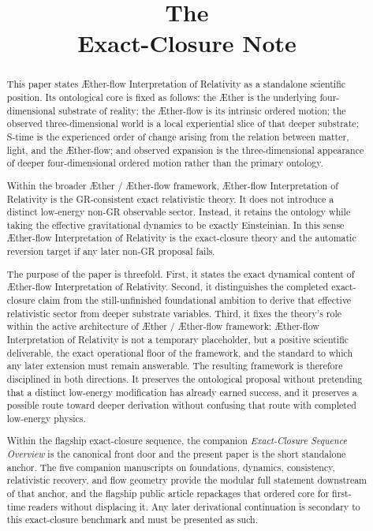 \documentclass[11pt]{article}
\title{\textbf{The \TheoryName{}}\\[0.4em]
\large Exact-Closure Note}
\author{}
\date{}
\newcommand{\Aether}{\AE{}ther}
\newcommand{\Aflow}{\AE{}ther-flow}
\newcommand{\TheoryName}{\Aflow{} Interpretation of Relativity}
\newcommand{\TheoryProgram}{\Aether{} / \Aflow{} framework}
\begin{document}
\maketitle

\begin{abstract}
This paper states \TheoryName{} as a standalone scientific position. Its ontological core is fixed as follows: the \Aether{} is the underlying four-dimensional substrate of reality; the \Aflow{} is its intrinsic ordered motion; the observed three-dimensional world is a local experiential slice of that deeper substrate; S-time is the experienced order of change arising from the relation between matter, light, and the \Aflow{}; and observed expansion is the three-dimensional appearance of deeper four-dimensional ordered motion rather than the primary ontology.

Within the broader \TheoryProgram{}, \TheoryName{} is the GR-consistent exact relativistic theory. It does not introduce a distinct low-energy non-GR observable sector. Instead, it retains the ontology while taking the effective gravitational dynamics to be exactly Einsteinian. In this sense \TheoryName{} is the exact-closure theory and the automatic reversion target if any later non-GR proposal fails.

The purpose of the paper is threefold. First, it states the exact dynamical content of \TheoryName{}. Second, it distinguishes the completed exact-closure claim from the still-unfinished foundational ambition to derive that effective relativistic sector from deeper substrate variables. Third, it fixes the theory's role within the active architecture of \TheoryProgram{}: \TheoryName{} is not a temporary placeholder, but a positive scientific deliverable, the exact operational floor of the framework, and the standard to which any later extension must remain answerable. The resulting framework is therefore disciplined in both directions. It preserves the ontological proposal without pretending that a distinct low-energy modification has already earned success, and it preserves a possible route toward deeper derivation without confusing that route with completed low-energy physics.

Within the flagship exact-closure sequence, the companion \emph{Exact-Closure Sequence Overview} is the canonical front door and the present paper is the short standalone anchor. The five companion manuscripts on foundations, dynamics, consistency, relativistic recovery, and flow geometry provide the modular full statement downstream of that anchor, and the flagship public article repackages that ordered core for first-time readers without displacing it. Any later derivational continuation is secondary to this exact-closure benchmark and must be presented as such.
\end{abstract}
\end{document}
